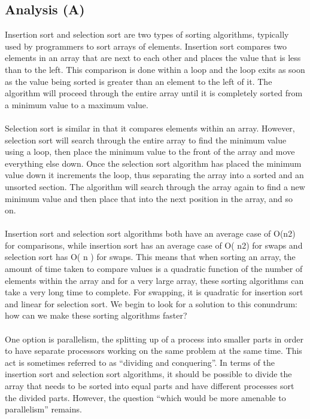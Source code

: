 \documentclass[12pt]{article}
\begin{document}
        \subsection{Analysis (A)}
        Insertion sort and selection sort are two types of sorting algorithms, typically used by programmers to sort arrays of elements. 
        Insertion sort compares two elements in an array that are next to each other and places the value that is less than to the left. 
        This comparison is done within a loop and the loop exits as soon as the value being sorted is greater than an element to the left 
        of it. The algorithm will proceed through the entire array until it is completely sorted from a minimum value to a maximum value. \\
        \\
        Selection sort is similar in that it compares elements within an array. However, selection sort will search through the entire array 
        to find the minimum value using a loop, then place the minimum value to the front of the array and move everything else down. Once 
        the selection sort algorithm has placed the minimum value down it increments the loop, thus separating the array into a sorted and an 
        unsorted section. The algorithm will search through the array again to find a new minimum value and then place that into the next 
        position in the array, and so on. \\
        \\
        Insertion sort and selection sort algorithms both have an average case of O(n2) for comparisons, while insertion sort has an average 
        case of O( n2) for swaps and selection sort has O( n ) for swaps. This means that when sorting an array, the amount of time taken to 
        compare values is a quadratic function of the number of elements within the array and for a very large array, these sorting algorithms 
        can take a very long time to complete. For swapping, it is quadratic for insertion sort and linear for selection sort. We begin to look 
        for a solution to this conundrum: how can we make these sorting algorithms faster? \\
        \\
        One option is parallelism, the splitting up of a process into smaller parts in order to have separate processors working on the same problem 
        at the same time. This act is sometimes referred to as “dividing and conquering”. In terms of the insertion sort and selection sort algorithms, 
        it should be possible to divide the array that needs to be sorted into equal parts and have different processes sort the divided parts. 
        However, the question “which would be more amenable to parallelism” remains. \\
        \\
\end{document}
